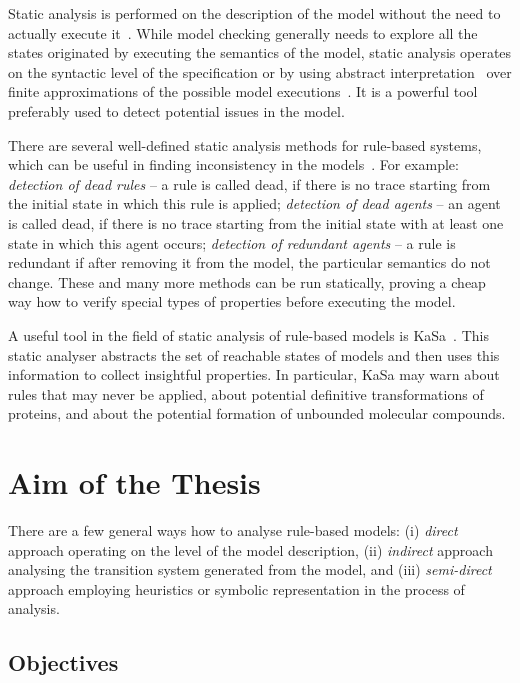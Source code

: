 \documentclass[11pt,a4paper]{report}
\begin{document}
Static analysis is performed on the description of the model without the need to actually execute it~\cite{nielson2015principles}. While model checking generally needs to explore all the states originated by executing the semantics of the model, static analysis operates on the syntactic level of the specification or by using abstract interpretation~\cite{cousot1977abstract} over finite approximations of the possible model executions~\cite{pauleve2012static}. It is a powerful tool preferably used to detect potential issues in the model.

There are several well-defined static analysis methods for rule-based systems, which can be useful in finding inconsistency in the models~\cite{danos2009rule}. For example: \emph{detection of dead rules} -- a rule is called dead, if there is no trace starting from the initial state in which this rule is applied; \emph{detection of dead agents} -- an agent is called dead, if there is no trace starting from the initial state with at least one state in which this agent occurs; \emph{detection of redundant agents} -- a rule is redundant if after removing it from the model, the particular semantics do not change. These and many more methods can be run statically, proving a cheap way how to verify special types of properties before executing the model.

A useful tool in the field of static analysis of rule-based models is KaSa~\cite{boutillier2018kasa}. This static analyser abstracts the set of reachable states of models and then uses this information to collect insightful properties. In particular, KaSa may warn about rules that may never be applied, about potential definitive transformations of proteins, and about the potential formation of unbounded molecular compounds.

\chapter{Aim of the Thesis} \label{chap:aim}

There are a few general ways how to analyse rule-based models: (i) \emph{direct} approach operating on the level of the model description, (ii) \emph{indirect} approach analysing the transition system generated from the model, and (iii) \emph{semi-direct} approach employing heuristics or symbolic representation in the process of analysis.

\section{Objectives}
\end{document}
